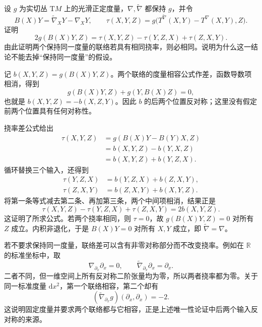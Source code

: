\begin{exercise}\label{g1:ex:metric-connection-determined-by-torsion}
	设 \(g\) 为实切丛 \(\mathrm{T}M\) 上的光滑正定度量，\(\nabla,\widetilde\nabla\) 都保持 \(g\)，并令
	\[
		B(X)Y=\widetilde\nabla_XY-\nabla_XY,\qquad
		\tau(X,Y,Z)=g\bigl(T^{\widetilde\nabla}(X,Y)-T^\nabla(X,Y),Z\bigr).
	\]
	证明
	\[
		2g(B(X)Y,Z)
		=\tau(X,Y,Z)-\tau(Y,Z,X)+\tau(Z,X,Y).
	\]
	由此证明两个保持同一度量的联络若具有相同挠率，则必相同。说明为什么这一结论不能去掉“保持同一度量”的假设。
\end{exercise}
\begin{solution}
	记 \(b(X,Y,Z)=g(B(X)Y,Z)\)。两个联络的度量相容公式作差，函数导数项相消，得到
	\[
		g(B(X)Y,Z)+g(Y,B(X)Z)=0,
	\]
	也就是 \(b(X,Y,Z)=-b(X,Z,Y)\)。因此 \(b\) 的后两个位置反对称；这里没有假定前两个位置具有任何对称性。

	挠率差公式给出
	\begin{align*}
		\tau(X,Y,Z)&=g(B(X)Y-B(Y)X,Z)\\
		&=b(X,Y,Z)-b(Y,X,Z)\\
		&=b(X,Y,Z)+b(Y,Z,X).
	\end{align*}
	循环替换三个输入，还得到
	\[
		\begin{aligned}
			\tau(Y,Z,X)&=b(Y,Z,X)+b(Z,X,Y),\\
			\tau(Z,X,Y)&=b(Z,X,Y)+b(X,Y,Z).
		\end{aligned}
	\]
	将第一条等式减去第二条、再加第三条，两个中间项相消，结果正是
	\[
		\tau(X,Y,Z)-\tau(Y,Z,X)+\tau(Z,X,Y)=2b(X,Y,Z).
	\]
	这证明了所求公式。若两个挠率相同，则 \(\tau=0\)，故 \(g(B(X)Y,Z)=0\) 对所有 \(Z\) 成立。内积非退化，于是 \(B(X)Y=0\) 对所有 \(X,Y\) 成立，即 \(\widetilde\nabla=\nabla\)。

	若不要求保持同一度量，联络差可以含有非零对称部分而不改变挠率。例如在 \(\mathbb R\) 的标准坐标中，取
	\[
		\nabla_{\partial_x}\partial_x=0,\qquad
		\widetilde\nabla_{\partial_x}\partial_x=\partial_x.
	\]
	二者不同，但一维空间上所有反对称二阶张量均为零，所以两者挠率都为零。关于同一标准度量 \(\mathrm{d}x^2\)，第一个联络相容，第二个却有
	\[
		(\widetilde\nabla_{\partial_x}g)(\partial_x,\partial_x)=-2.
	\]
	这说明固定度量并要求两个联络都与它相容，正是上述唯一性论证中后两个输入反对称的来源。
\end{solution}


